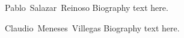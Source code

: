 \documentclass[journal]{IEEEtran}
\begin{document}
\begin{IEEEbiography}{Pablo~Salazar~Reinoso}
Biography text here.
\end{IEEEbiography}


\begin{IEEEbiography}{Claudio~Meneses~Villegas}
Biography text here.
\end{IEEEbiography}






\end{document}
